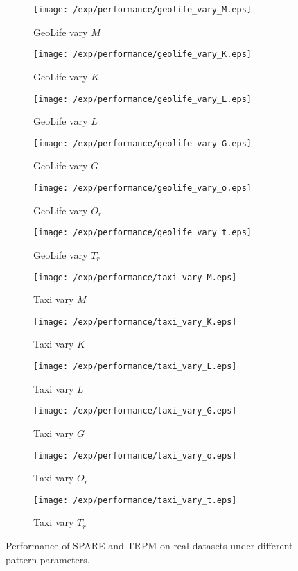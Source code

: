 \begin{figure*}[t]
	\begin{subfigure}[b]{0.16\textwidth}
        \texttt{[image: /exp/performance/geolife\_vary\_M.eps]}
        \caption{GeoLife vary $M$}
    \end{subfigure}
    \begin{subfigure}[b]{0.16\textwidth}
        \texttt{[image: /exp/performance/geolife\_vary\_K.eps]}
        \caption{GeoLife vary $K$}
    \end{subfigure}
    \begin{subfigure}[b]{0.16\textwidth}
        \texttt{[image: /exp/performance/geolife\_vary\_L.eps]}
        \caption{GeoLife vary $L$}
    \end{subfigure}
       \begin{subfigure}[b]{0.16\textwidth}
        \texttt{[image: /exp/performance/geolife\_vary\_G.eps]}
        \caption{GeoLife vary $G$}
    \end{subfigure}       
 	 \begin{subfigure}[b]{0.16\textwidth}
        \texttt{[image: /exp/performance/geolife\_vary\_o.eps]}
        \caption{GeoLife vary $O_r$}
    \end{subfigure}
 	\begin{subfigure}[b]{0.16\textwidth}
        \texttt{[image: /exp/performance/geolife\_vary\_t.eps]}
        \caption{GeoLife vary $T_r$}
    \end{subfigure}    
    
    \begin{subfigure}[b]{0.16\textwidth}
        \texttt{[image: /exp/performance/taxi\_vary\_M.eps]}
        \caption{Taxi vary $M$}
    \end{subfigure}
    \begin{subfigure}[b]{0.16\textwidth}
        \texttt{[image: /exp/performance/taxi\_vary\_K.eps]}
        \caption{Taxi vary $K$}
    \end{subfigure}
    \begin{subfigure}[b]{0.16\textwidth}
        \texttt{[image: /exp/performance/taxi\_vary\_L.eps]}
        \caption{Taxi vary $L$}
    \end{subfigure}
       \begin{subfigure}[b]{0.16\textwidth}
        \texttt{[image: /exp/performance/taxi\_vary\_G.eps]}
        \caption{Taxi vary $G$}
    \end{subfigure}   
	 \begin{subfigure}[b]{0.16\textwidth}
        \texttt{[image: /exp/performance/taxi\_vary\_o.eps]}
        \caption{Taxi vary $O_r$}
    \end{subfigure}
    	 \begin{subfigure}[b]{0.16\textwidth}
        \texttt{[image: /exp/performance/taxi\_vary\_t.eps]}
        \caption{Taxi vary $T_r$}
    \end{subfigure}      
        
\caption{Performance of SPARE and TRPM on real datasets under different pattern parameters.}
\label{exp:performance_vary}
\end{figure*}
